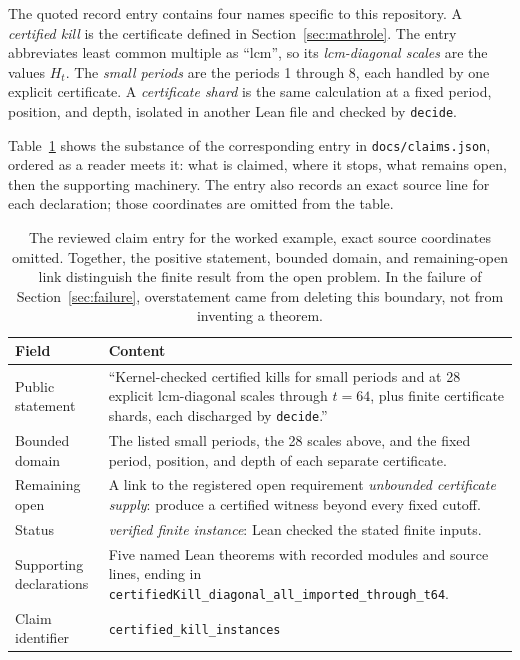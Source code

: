 \documentclass[11pt]{article}
\begin{document}
The quoted record entry contains four names specific to this repository.  A
\emph{certified kill} is the certificate defined in
Section~\ref{sec:mathrole}.  The entry abbreviates least common multiple as
``lcm'', so its \emph{lcm-diagonal scales} are the values $H_t$.  The
\emph{small periods} are the periods 1 through 8, each handled by one explicit
certificate.  A \emph{certificate shard} is the same calculation at a fixed
period, position, and depth, isolated in another Lean file and checked by
\texttt{decide}.

Table~\ref{tab:record} shows the substance of the corresponding entry in
\texttt{docs/claims.json}, ordered as a reader meets it: what is claimed,
where it stops, what remains open, then the supporting machinery.  The entry
also records an exact source line for each declaration; those coordinates are
omitted from the table.

\begin{table}[H]
\centering\footnotesize
\begin{tabular}{@{}>{\raggedright\arraybackslash}p{}
                    >{\raggedright\arraybackslash}p{}@{}}
\toprule
Field & Content \\
\midrule
Public statement & ``Kernel-checked certified kills for small periods and at
  28 explicit lcm-diagonal scales through $t = 64$, plus finite certificate
  shards, each discharged by \texttt{decide}.'' \\
\addlinespace
Bounded domain & The listed small periods, the 28 scales above, and the fixed
  period, position, and depth of each separate certificate. \\
\addlinespace
Remaining open & A link to the registered open requirement \emph{unbounded
  certificate supply}: produce a certified witness beyond every fixed cutoff. \\
\addlinespace
Status & \emph{verified finite instance}: Lean checked the stated finite
  inputs. \\
\addlinespace
Supporting declarations & Five named Lean theorems with recorded modules
  and source lines, ending in
  \texttt{certifiedKill\_diagonal\_all\_imported\_through\_t64}. \\
\addlinespace
Claim identifier & \texttt{certified\_kill\_instances} \\
\bottomrule
\end{tabular}
\caption{The reviewed claim entry for the worked example, exact source
coordinates omitted.  Together, the positive statement, bounded domain, and
remaining-open link distinguish the finite result from the open problem.  In
the failure of Section~\ref{sec:failure}, overstatement came from deleting
this boundary, not from inventing a theorem.}
\label{tab:record}
\end{table}
\end{document}
